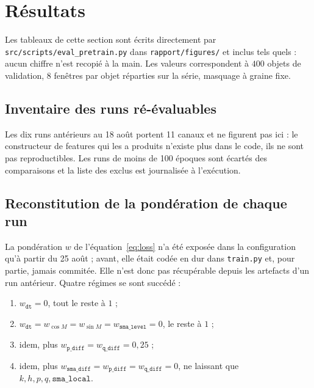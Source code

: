 \documentclass{article}
\begin{document}
\section{Résultats}

Les tableaux de cette section sont écrits directement par \texttt{src/scripts/eval\_pretrain.py} dans \texttt{rapport/figures/} et inclus tels quels : aucun chiffre n'est recopié à la main. Les valeurs correspondent à $400$ objets de validation, $8$ fenêtres par objet réparties sur la série, masquage à graine fixe.

\subsection{Inventaire des runs ré-évaluables}

\begin{center}\small

\end{center}

Les dix runs antérieurs au 18 août portent 11 canaux et ne figurent pas ici : le constructeur de features qui les a produits n'existe plus dans le code, ils ne sont pas reproductibles. Les runs de moins de 100 époques sont écartés des comparaisons et la liste des exclus est journalisée à l'exécution.

\subsection{Reconstitution de la pondération de chaque run}

La pondération $w$ de l'équation~\eqref{eq:loss} n'a été exposée dans la configuration qu'à partir du 25 août ; avant, elle était codée en dur dans \texttt{train.py} et, pour partie, jamais commitée. Elle n'est donc pas récupérable depuis les artefacts d'un run antérieur. Quatre régimes se sont succédé :

\begin{enumerate}
    \item $w_{\texttt{dt}} = 0$, tout le reste à $1$ ;
    \item $w_{\texttt{dt}} = w_{\cos M} = w_{\sin M} = w_{\texttt{sma\_level}} = 0$, le reste à $1$ ;
    \item idem, plus $w_{\texttt{p\_diff}} = w_{\texttt{q\_diff}} = 0{,}25$ ;
    \item idem, plus $w_{\texttt{sma\_diff}} = w_{\texttt{p\_diff}} = w_{\texttt{q\_diff}} = 0$, ne laissant que $k, h, p, q, \texttt{sma\_local}$.
\end{enumerate}
\end{document}
